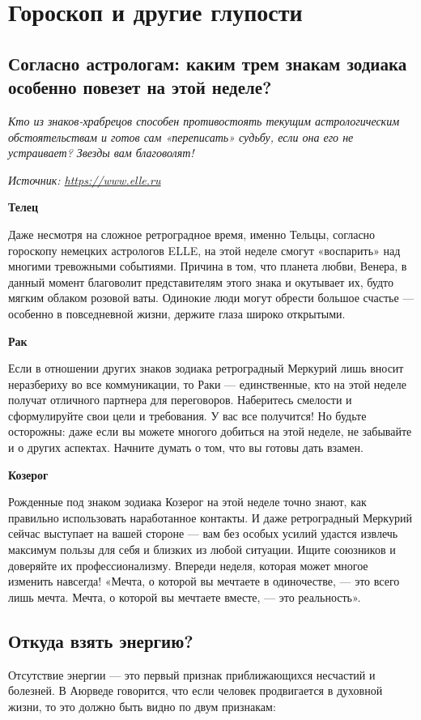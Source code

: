 \chapter{Гороскоп и другие глупости}

\section{Согласно астрологам: каким трем знакам зодиака особенно повезет на этой неделе?}

\textit{Кто из знаков-храбрецов способен противостоять текущим астрологическим обстоятельствам и готов сам «переписать» судьбу, если она его не устраивает? Звезды вам благоволят!}

\textit{Источник: \url{https://www.elle.ru}}

\textbf{Телец}

Даже несмотря на сложное ретроградное время, именно Тельцы, согласно гороскопу немецких астрологов ELLE, на этой неделе смогут «воспарить» над многими тревожными событиями. Причина в том, что планета любви, Венера, в данный момент благоволит представителям этого знака и окутывает их, будто мягким облаком розовой ваты. Одинокие люди могут обрести большое счастье — особенно в повседневной жизни, держите глаза широко открытыми.

\textbf{Рак}

Если в отношении других знаков зодиака ретроградный Меркурий лишь вносит неразбериху во все коммуникации, то Раки — единственные, кто на этой неделе получат отличного партнера для переговоров. Наберитесь смелости и сформулируйте свои цели и требования. У вас все получится! Но будьте осторожны: даже если вы можете многого добиться на этой неделе, не забывайте и о других аспектах. Начните думать о том, что вы готовы дать взамен.

\textbf{Козерог}

Рожденные под знаком зодиака Козерог на этой неделе точно знают, как правильно использовать наработанное контакты. И даже ретроградный Меркурий сейчас выступает на вашей стороне — вам без особых усилий удастся извлечь максимум пользы для себя и близких из любой ситуации. Ищите союзников и доверяйте их профессионализму. Впереди неделя, которая может многое изменить навсегда! «Мечта, о которой вы мечтаете в одиночестве, — это всего лишь мечта. Мечта, о которой вы мечтаете вместе, — это реальность».



\section{Откуда взять энергию?}
Отсутствие энергии --- это первый признак приближающихся несчастий и болезней. В Аюрведе говорится, что если человек продвигается в духовной жизни, то это должно быть видно по двум признакам:

